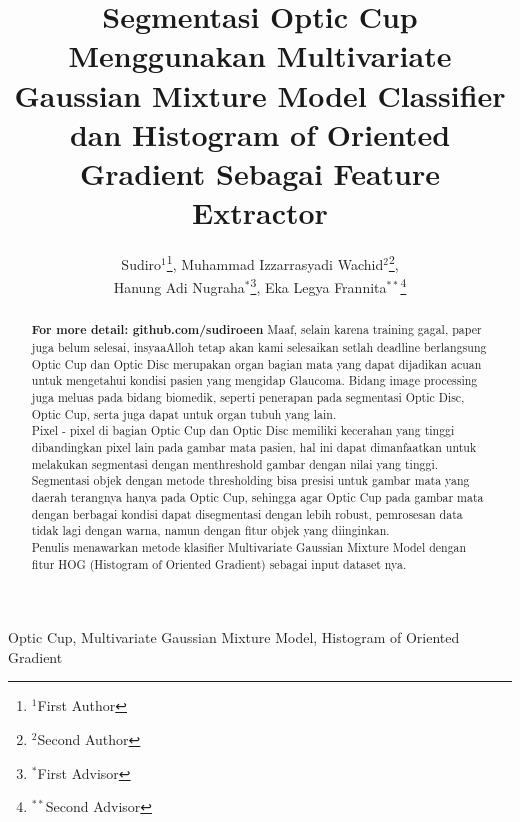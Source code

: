 \documentclass[]{IEEEphot}
\begin{document}
\title{Segmentasi Optic Cup Menggunakan Multivariate Gaussian Mixture Model Classifier dan Histogram of Oriented Gradient Sebagai Feature Extractor}

\author{Sudiro$^1$\footnote{$^1$First Author}, Muhammad Izzarrasyadi Wachid$^2$\footnote{$^2$Second Author},\\
Hanung Adi Nugraha$^*$\footnote{$^*$First Advisor}, Eka Legya Frannita$^{**}$\footnote{$^{**}$Second Advisor}}


\maketitle

\begin{abstract}
\textbf{For more detail: github.com/sudiroeen} Maaf, selain karena training gagal, paper juga belum selesai, insyaaAlloh tetap akan kami selesaikan setlah deadline berlangsung\\

\noindent Optic Cup dan Optic Disc merupakan organ bagian mata yang dapat dijadikan acuan untuk mengetahui kondisi pasien yang mengidap Glaucoma. Bidang image processing juga meluas pada bidang biomedik, seperti penerapan pada segmentasi Optic Disc, Optic Cup, serta juga dapat untuk organ tubuh yang lain. \\

\noindent Pixel - pixel di bagian Optic Cup dan Optic Disc memiliki kecerahan yang tinggi dibandingkan pixel lain pada gambar mata pasien, hal ini dapat dimanfaatkan untuk melakukan segmentasi dengan menthreshold gambar dengan nilai yang tinggi. \\
Segmentasi objek dengan metode thresholding bisa presisi untuk gambar mata yang daerah terangnya hanya pada Optic Cup, sehingga agar Optic Cup pada gambar mata dengan berbagai kondisi dapat disegmentasi dengan lebih robust, pemrosesan data tidak lagi dengan warna, namun dengan fitur objek yang diinginkan. \\

\noindent Penulis menawarkan metode klasifier Multivariate Gaussian Mixture Model dengan fitur HOG (Histogram of Oriented Gradient) sebagai input dataset nya.
\end{abstract}

\begin{IEEEkeywords}
Optic Cup, Multivariate Gaussian Mixture Model, Histogram of Oriented Gradient
\end{IEEEkeywords}
\end{document}

